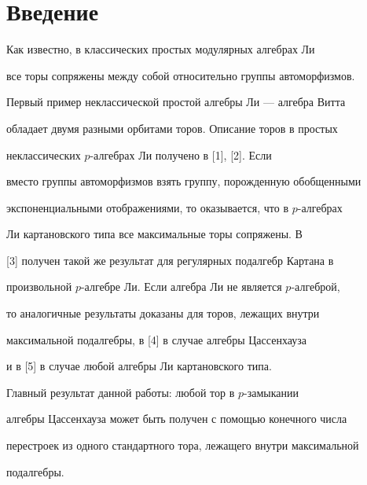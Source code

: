  




\maketitle 


\label{begin} 


 


\section*{Введение} 


 


Как известно, в классических простых модулярных алгебрах Ли 


все торы сопряжены между собой относительно группы автоморфизмов. 


Первый пример неклассической простой алгебры Ли --- алгебра Витта 


обладает двумя разными орбитами торов. Описание торов в простых 


неклассических $p$-алгебрах Ли получено в [1], [2]. Если 


вместо группы автоморфизмов взять группу, порожденную обобщенными 


экспоненциальными отображениями, то оказывается, что в $p$-алгебрах 


Ли картановского типа все максимальные торы сопряжены. В 


[3] получен такой же результат для регулярных подалгебр Картана в 


произвольной $p$-алгебре Ли. Если алгебра Ли не является $p$-алгеброй, 


то аналогичные результаты доказаны для торов, лежащих внутри 


максимальной подалгебры, в [4] в случае алгебры Цассенхауза 


и в [5] в случае любой алгебры Ли картановского типа. 


 


Главный результат данной работы: любой тор в $p$-замыкании 


алгебры Цассенхауза может быть получен с помощью конечного числа 


перестроек из одного стандартного тора, лежащего внутри максимальной 


подалгебры. 


